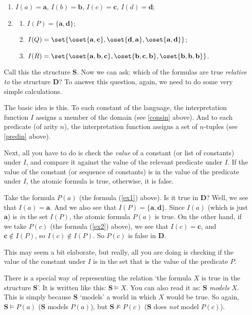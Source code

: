 \begin{enumerate}
	\item $I(a)=\mathbf{a}$, $I(b)=\mathbf{b}$, $I(c)=\mathbf{c}$, $I(d)=\mathbf{d}$; \label{consin}
	\item \label{predin}
		\begin{enumerate}
	\item $I(P)=\{\mathbf{a}, \mathbf{d}\}$;
	\item $I(Q)=\set{\oset{\mathbf{a}, \mathbf{c}}, \oset{\mathbf{d}, \mathbf{a}}, \oset{\mathbf{a}, \mathbf{d}}}$;
	\item $I(R)=\set{\oset{\mathbf{a}, \mathbf{b}, \mathbf{c}}, \oset{\mathbf{b}, \mathbf{c}, \mathbf{b}}, \oset{\mathbf{b}, \mathbf{b}, \mathbf{b}}}$.
		\end{enumerate} 
\end{enumerate}

Call this the structure $\mathbf{S}$. Now we can ask: which of the formulas are true \textit{relative to} the structure $\mathbf{D}$? To answer this question, again, we need to do some very simple calculations. 

The basic idea is this. To each constant of the language, the interpretation function $I$ assigns a member of the domain (see \ref{consin} above). And to each predicate (of arity $n$), the interpretation function assigns a set of $n$-tuples (see \ref{predin} above).

Next, all you have to do is check the \textit{value} of a constant (or list of constants) under $I$, and compare it against the value of the relevant predicate under $I$. If the value of the constant (or sequence of constants) is in the value of the predicate under $I$, the atomic formula is true, otherwise, it is false. 

Take the formula $P(a)$ (the formula (\ref{ex1}) above). Is it true in $\mathbf{D}$? Well, we see that $I(a)=\mathbf{a}$. And we also see that $I(P)=\{\mathbf{a}, \mathbf{d}\}$. Since $I(a)$ (which is just $\mathbf{a}$) is \textit{in} the set $I(P)$, the atomic formula $P(a)$ is true. On the other hand, if we take $P(c)$ (the formula (\ref{ex2}) above), we see that $I(c)=\mathbf{c}$, and $\mathbf{c} \notin I(P)$, so $I(c) \notin I(P)$. So $P(c)$ is false in $\mathbf{D}$. 

This may seem a bit elaborate, but really, all you are doing is checking if the value of the constant under $I$ is in the set that is the value of the predicate $P$. 

There is a special way of representing the relation `the formula $X$ is true in the structure $\mathbf{S}$'. It is written like this: $\mathbf{S} \models X$. You can also read it as: $\mathbf{S}$ \textit{models} $X$. This is simply because $\mathbf{S}$ `models' a world in which $X$ would be true. So again, $\mathbf{S}\models P(a)$ ($\mathbf{S}$ models $P(a)$), but $\mathbf{S}\not\models P(c)$ ($\mathbf{S}$ does \textit{not} model $P(c)$).

